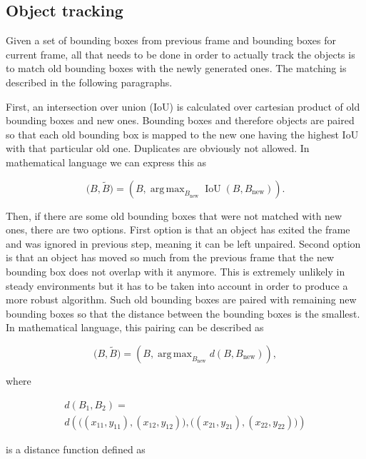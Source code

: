 \documentclass[10pt,twocolumn,letterpaper]{article}
\DeclareMathOperator{\iou}{IoU}
\DeclareMathOperator*{\argmax}{arg\,max}
\begin{document}
\subsection{Object tracking}\label{sofot_track}

Given a set of bounding boxes from previous frame and bounding boxes for current
frame, all that needs to be done in order to actually track the objects is to match
old bounding boxes with the newly generated ones. The matching is described in the following
paragraphs.

First, an intersection over union (IoU) is calculated over cartesian product of
old bounding boxes and new ones. Bounding boxes and therefore objects are paired so that
each old bounding box is mapped to the new one having the highest IoU with that particular
old one. Duplicates are obviously not allowed. In mathematical language we can express this
as

\begin{equation}
   \big(B, \tilde{B}\big) = \left(B, \argmax_{B_{\text{new}}} \iou(B,B_{\text{new}})\right).
\end{equation}

Then, if there are some old bounding boxes that were not matched with new ones, there are two
options. First option is that an object has exited the frame and was ignored in previous step, meaning it
can be left unpaired. Second option is that an object has moved so much from the previous frame
that the new bounding box does not overlap with it anymore. This is extremely unlikely in
steady environments but it has to be taken into account in order to produce a more robust algorithm.
Such old bounding boxes are paired with remaining new bounding boxes so that the distance
between the bounding boxes is the smallest. In mathematical language, this pairing
can be described as

\begin{equation}
   \big(B, \tilde{B}\big) = \left( B, \argmax_{B_{\text{new}}} d(B, B_{\text{new}}) \right),
\end{equation}

where

\begin{multline}
   d(B_1, B_2) =\\ d\left( \big((x_{11}, y_{11}), (x_{12}, y_{12})\big), \big((x_{21}, y_{21}), (x_{22}, y_{22})\big) \right)
\end{multline}

is a distance function defined as
\end{document}
